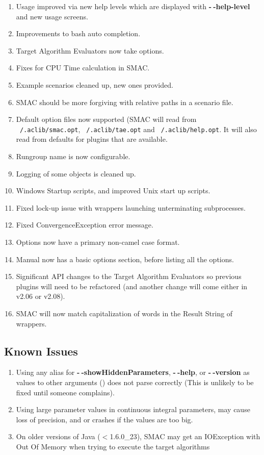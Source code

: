 \documentclass[11pt,letterpaper,oneside]{article}
\begin{document}
\begin{description}
\begin{enumerate}
					 \item Usage improved via new help levels which are displayed with \textbf{-$~\!$-help-level} and new usage screens.
					 \item Improvements to bash auto completion.
					 \item Target Algorithm Evaluators now take options.
					 \item Fixes for CPU Time calculation in SMAC.
					 \item Example scenarios cleaned up, new ones provided.
					 \item SMAC should be more forgiving with relative paths in a scenario file.
					 \item Default option files now supported (SMAC will read from \texttt{~/.aclib/smac.opt}, \texttt{~/.aclib/tae.opt} and \texttt{~/.aclib/help.opt}. It will also read from defaults for plugins that are available.
					 \item Rungroup name is now configurable.
					 \item Logging of some objects is cleaned up.
					 \item Windows Startup scripts, and improved Unix start up scripts.
					 \item Fixed lock-up issue with wrappers launching unterminating subprocesses.
					 \item Fixed ConvergenceException error message.
					 \item Options now have a primary non-camel case format.
					 \item Manual now has a basic options section, before listing all the options.
					 \item Significant API changes to the Target Algorithm Evaluators so previous plugins will need to be refactored (and another change will come either in v2.06 or v2.08).
					 \item SMAC will now match capitalization of words in the Result String of wrappers.
                  \end{enumerate}


		
	\end{description}
\subsection{Known Issues}

\begin{enumerate}
\item Using any alias for \textbf{-$~\!$-showHiddenParameters}, \textbf{-$~\!$-help}, or \textbf{-$~\!$-version} as values to other arguments () does not parse correctly (This is unlikely to be fixed until someone complains).
\item Using large parameter values in continuous integral parameters, may cause loss of precision, and or crashes if the values are too big.
\item On older versions of Java ($<$1.6.0\_23), SMAC  may get an IOException with Out Of Memory when trying to execute the target algorithms
\end{enumerate}
\end{document}
